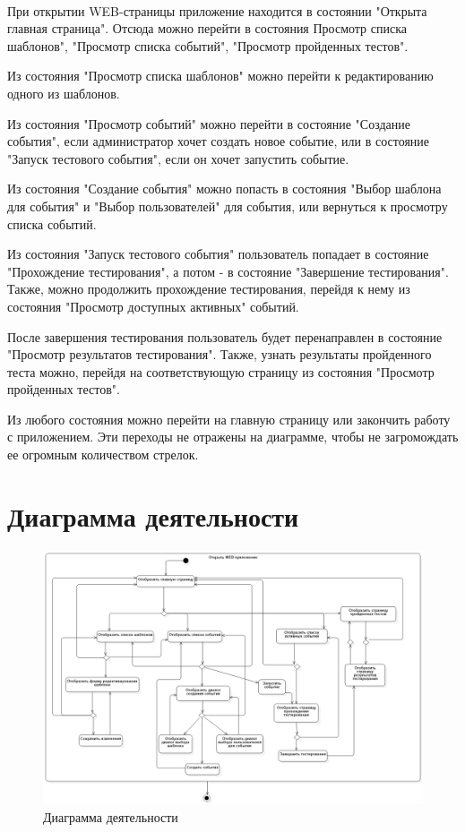\documentclass{article}
\begin{document}
    \paragraph{}
    При открытии WEB-страницы приложение находится в
    состоянии "Открыта главная страница". Отсюда можно перейти 
    в состояния  Просмотр списка шаблонов", "Просмотр списка событий",
    "Просмотр пройденных тестов".
    \par Из состояния "Просмотр списка шаблонов" можно перейти
    к редактированию одного из шаблонов.
    \par Из состояния "Просмотр событий" можно перейти в
    состояние "Создание события", если администратор хочет
    создать новое событие, или в состояние "Запуск тестового
    события", если он хочет запустить событие.
    \par Из состояния "Создание события" можно попасть в
    состояния "Выбор шаблона для события" и "Выбор пользователей"
    для события, или вернуться к просмотру списка событий.
    \par Из состояния "Запуск тестового события" пользователь
    попадает в состояние "Прохождение тестирования", а потом - 
    в состояние "Завершение тестирования". Также, можно
    продолжить прохождение тестирования, перейдя к нему из
    состояния "Просмотр доступных активных" событий.
    \par После завершения тестирования пользователь будет
    перенаправлен в состояние "Просмотр результатов тестирования".
    Также, узнать результаты пройденного теста можно, перейдя
    на соответствующую страницу из состояния "Просмотр пройденных
    тестов".
    \par Из любого состояния можно перейти на главную страницу
    или закончить работу с приложением. Эти переходы не отражены
    на диаграмме, чтобы не загромождать ее огромным количеством
    стрелок.

    
    \section{Диаграмма деятельности}
    \begin{figure}[H]
        \includegraphics[width=\textwidth, center]
        {ActivityDiagram_WEB.png}
        \caption{Диаграмма деятельности}
    \end{figure}
        
\end{document}

